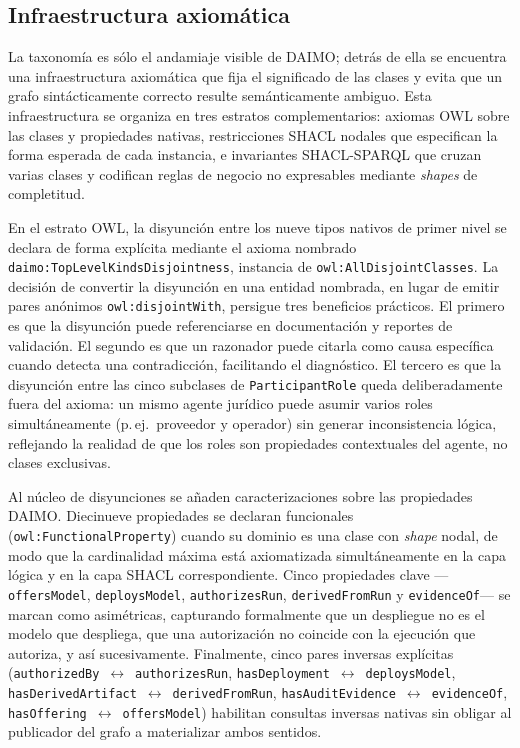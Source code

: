 \documentclass[11pt,a4paper]{article}
\newcommand{\code}[1]{\texttt{#1}}
\begin{document}
\subsection{Infraestructura axiomática}\label{sec:axiomatic}

La taxonomía es sólo el andamiaje visible de DAIMO; detrás de ella se encuentra una infraestructura axiomática que fija el significado de las clases y evita que un grafo sintácticamente correcto resulte semánticamente ambiguo. Esta infraestructura se organiza en tres estratos complementarios: axiomas OWL sobre las clases y propiedades nativas, restricciones SHACL nodales que especifican la forma esperada de cada instancia, e invariantes SHACL-SPARQL que cruzan varias clases y codifican reglas de negocio no expresables mediante \emph{shapes} de completitud.

En el estrato OWL, la disyunción entre los nueve tipos nativos de primer nivel se declara de forma explícita mediante el axioma nombrado \code{daimo:TopLevelKindsDisjointness}, instancia de \code{owl:AllDisjointClasses}. La decisión de convertir la disyunción en una entidad nombrada, en lugar de emitir pares anónimos \code{owl:disjointWith}, persigue tres beneficios prácticos. El primero es que la disyunción puede referenciarse en documentación y reportes de validación. El segundo es que un razonador puede citarla como causa específica cuando detecta una contradicción, facilitando el diagnóstico. El tercero es que la disyunción entre las cinco subclases de \code{ParticipantRole} queda deliberadamente fuera del axioma: un mismo agente jurídico puede asumir varios roles simultáneamente (p.\,ej.\ proveedor y operador) sin generar inconsistencia lógica, reflejando la realidad de que los roles son propiedades contextuales del agente, no clases exclusivas.

Al núcleo de disyunciones se añaden caracterizaciones sobre las propiedades DAIMO. Diecinueve propiedades se declaran funcionales (\code{owl:FunctionalProperty}) cuando su dominio es una clase con \emph{shape} nodal, de modo que la cardinalidad máxima está axiomatizada simultáneamente en la capa lógica y en la capa SHACL correspondiente. Cinco propiedades clave ---\code{offersModel}, \code{deploysModel}, \code{authorizesRun}, \code{derivedFromRun} y \code{evidenceOf}--- se marcan como asimétricas, capturando formalmente que un despliegue no es el modelo que despliega, que una autorización no coincide con la ejecución que autoriza, y así sucesivamente. Finalmente, cinco pares inversas explícitas (\code{authorizedBy}~$\leftrightarrow$~\code{authorizesRun}, \code{hasDeployment}~$\leftrightarrow$~\code{deploysModel}, \code{hasDerivedArtifact}~$\leftrightarrow$~\code{derivedFromRun}, \code{hasAuditEvidence}~$\leftrightarrow$~\code{evidenceOf}, \code{hasOffering}~$\leftrightarrow$~\code{offersModel}) habilitan consultas inversas nativas sin obligar al publicador del grafo a materializar ambos sentidos.
\end{document}
